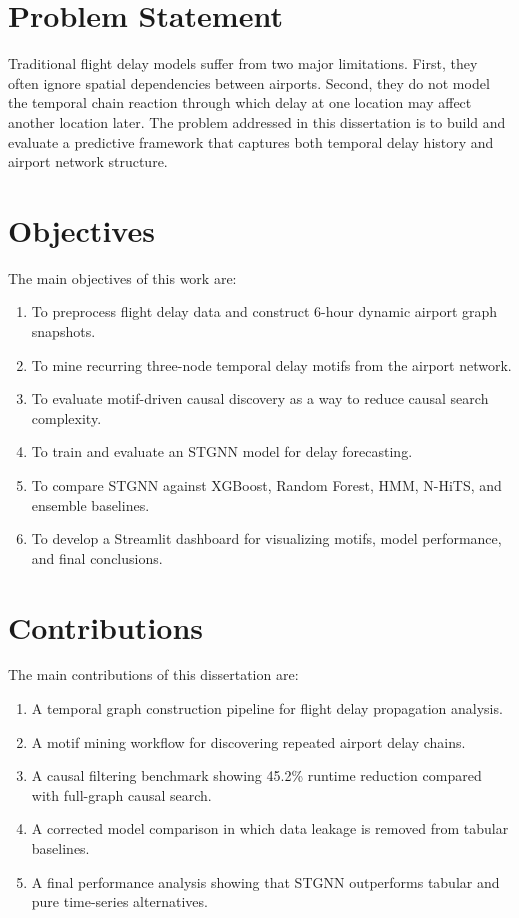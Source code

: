 \documentclass[12pt,a4paper]{report}
\begin{document}
\section{Problem Statement}
Traditional flight delay models suffer from two major limitations. First, they often ignore spatial dependencies between airports. Second, they do not model the temporal chain reaction through which delay at one location may affect another location later. The problem addressed in this dissertation is to build and evaluate a predictive framework that captures both temporal delay history and airport network structure.

\section{Objectives}
The main objectives of this work are:
\begin{enumerate}
	\item To preprocess flight delay data and construct 6-hour dynamic airport graph snapshots.
	\item To mine recurring three-node temporal delay motifs from the airport network.
	\item To evaluate motif-driven causal discovery as a way to reduce causal search complexity.
	\item To train and evaluate an STGNN model for delay forecasting.
	\item To compare STGNN against XGBoost, Random Forest, HMM, N-HiTS, and ensemble baselines.
	\item To develop a Streamlit dashboard for visualizing motifs, model performance, and final conclusions.
\end{enumerate}

\section{Contributions}
The main contributions of this dissertation are:
\begin{enumerate}
	\item A temporal graph construction pipeline for flight delay propagation analysis.
	\item A motif mining workflow for discovering repeated airport delay chains.
	\item A causal filtering benchmark showing 45.2\% runtime reduction compared with full-graph causal search.
	\item A corrected model comparison in which data leakage is removed from tabular baselines.
	\item A final performance analysis showing that STGNN outperforms tabular and pure time-series alternatives.
\end{enumerate}
\end{document}

